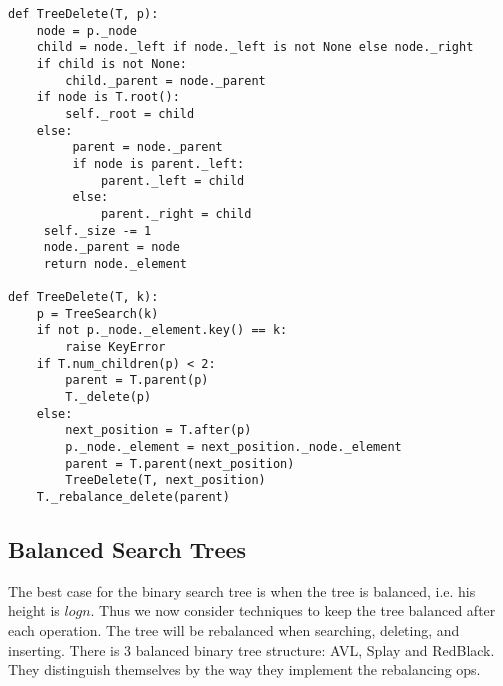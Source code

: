 \documentclass[10pt]{article}
\begin{document}
\begin{verbatim}
def TreeDelete(T, p):
    node = p._node
    child = node._left if node._left is not None else node._right
    if child is not None:
        child._parent = node._parent
    if node is T.root():
        self._root = child
    else:
         parent = node._parent
         if node is parent._left:
             parent._left = child
         else:
             parent._right = child
     self._size -= 1
     node._parent = node
     return node._element
	
def TreeDelete(T, k):
    p = TreeSearch(k)
    if not p._node._element.key() == k: 
        raise KeyError
    if T.num_children(p) < 2:
        parent = T.parent(p)
        T._delete(p)
    else:
        next_position = T.after(p)
        p._node._element = next_position._node._element
        parent = T.parent(next_position)
        TreeDelete(T, next_position)
    T._rebalance_delete(parent)
\end{verbatim}

\subsection{Balanced Search Trees}

The best case for the binary search tree is when the tree is balanced, i.e. his height is $log n$. Thus we now consider techniques to keep the tree balanced after each operation. The tree will be rebalanced when searching, deleting, and inserting. There is 3 balanced binary tree structure: AVL, Splay and RedBlack. They distinguish themselves by the way they implement the rebalancing ops. 
\end{document}
